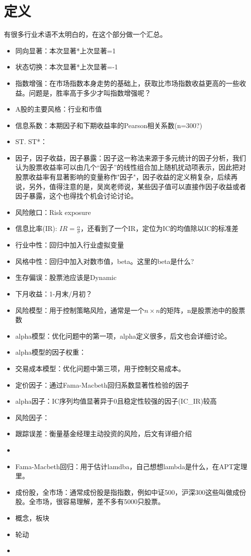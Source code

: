 \documentclass[12pt]{article}
\theoremstyle{definition}
\begin{document}
\section{定义}
有很多行业术语不太明白的，在这个部分做一个汇总。
\begin{sdefinition}{}{}
\begin{itemize}
	\item 同向显著：本次显著*上次显著=1
	\item 状态切换：本次显著*上次显著=-1
	\item 指数增强：在市场指数本身走势的基础上，获取比市场指数收益更高的一些收益。问题是，胜率高于多少才叫指数增强呢？
	\item A股的主要风格：行业和市值
	\item 信息系数：本期因子和下期收益率的Pearson相关系数(n=300?)
	\item ST. ST*：
	\item 因子，因子收益，因子暴露：因子这一称法来源于多元统计的因子分析，我们认为股票收益率可以由几个“因子”的线性组合加上随机扰动项表示，因此把对股票收益率有显著影响的变量称作"因子"，因子收益的定义稍复杂，后续再说，另外，值得注意的是，吴岚老师说，某些因子值可以直接作因子收益或者因子暴露，这个也得找个机会讨论讨论。
	\item 风险敞口：Risk exposure
	\item 信息比率(IR): $IR = \frac{\alpha}{\sigma}$，还看到了一个IR，定位为IC的均值除以IC的标准差
	\item 行业中性：回归中加入行业虚拟变量
	\item 风格中性：回归中加入对数市值，beta。这里的beta是什么?
	\item 生存偏误：股票池应该是Dynamic
	\item 下月收益：1-月末/月初？
	\item 风险模型：用于控制策略风险，通常是一个$n\times n$的矩阵，n是股票池中的股票数
	\item alpha模型：优化问题中的第一项，alpha定义很多，后文也会详细讨论。
	\item alpha模型的因子权重：
	\item 交易成本模型：优化问题中第三项，用于控制交易成本。
	\item 定价因子：通过Fama-Macbeth回归系数显著性检验的因子
	\item alpha因子：IC序列均值显著异于0且稳定性较强的因子(IC\_IR)较高
	\item 风险因子：
	\item 跟踪误差：衡量基金经理主动投资的风险，后文有详细介绍
	\item 
	\item Fama-Macbeth回归：用于估计lamdba，自己想想lambda是什么，在APT定理里。
	\item 成份股，全市场：通常成份股是指指数，例如中证500，沪深300这些叫做成份股。全市场，很容易理解，差不多有5000只股票。
	\item 概念，板块
	\item 轮动
	\item 
\end{itemize}
\end{sdefinition}
\end{document}
